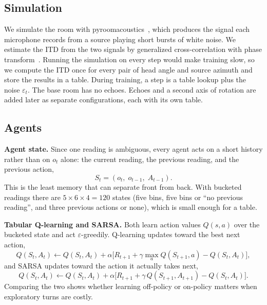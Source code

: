\documentclass{article}
\begin{document}
\subsection{Simulation}

We simulate the room with pyroomacoustics~\cite{scheibler2018pyroomacoustics},
which produces the signal each microphone records from a source playing short
bursts of white noise. We estimate the ITD from the two signals by generalized
cross-correlation with phase transform~\cite{knapp1976generalized}. Running the
simulation on every step would make training slow, so we compute the ITD once
for every pair of head angle and source azimuth and store the results in a
table. During training, a step is a table lookup plus the noise
$\varepsilon_t$. The base room has no echoes. Echoes and a second axis of
rotation are added later as separate configurations, each with its own table.

\subsection{Agents}

\textbf{Agent state.} Since one reading is ambiguous, every agent acts on a
short history rather than on $o_t$ alone: the current reading, the previous
reading, and the previous action,
\begin{equation}
  S_t = (o_t,\; o_{t-1},\; A_{t-1}).
\end{equation}
This is the least memory that can separate front from back. With bucketed
readings there are $5 \times 6 \times 4 = 120$ states (five bins, five bins
or ``no previous reading'', and three previous actions or none), which is
small enough for a table.

\textbf{Tabular Q-learning and SARSA.} Both learn action values $Q(s, a)$ over
the bucketed state and act $\varepsilon$-greedily. Q-learning updates toward
the best next action,
\begin{equation}
  Q(S_t, A_t) \leftarrow Q(S_t, A_t) + \alpha \bigl[ R_{t+1} +
  \gamma \max_{a} Q(S_{t+1}, a) - Q(S_t, A_t) \bigr],
\end{equation}
and SARSA updates toward the action it actually takes next,
\begin{equation}
  Q(S_t, A_t) \leftarrow Q(S_t, A_t) + \alpha \bigl[ R_{t+1} +
  \gamma\, Q(S_{t+1}, A_{t+1}) - Q(S_t, A_t) \bigr].
\end{equation}
Comparing the two shows whether learning off-policy or on-policy matters when
exploratory turns are costly.
\end{document}
